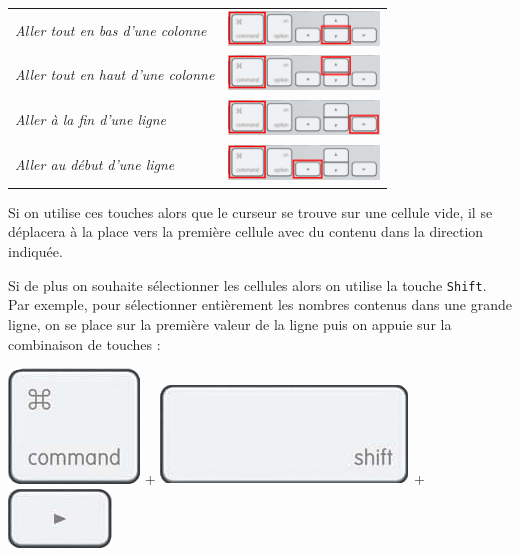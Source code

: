 \begin{center}
	\begin{tabular}{ll}
		\textsl{Aller tout en bas d'une colonne} & \includegraphics[width=4cm]{./images/tableur03/clavierCmDdown} \\     
		\textsl{Aller tout en haut d'une colonne} & \includegraphics[width=4cm]{./images/tableur03/clavierCmDup} \\  
		\textsl{Aller à la fin d'une ligne} & \includegraphics[width=4cm]{./images/tableur03/clavierCmDright} \\  
		\textsl{Aller au début d'une ligne} & \includegraphics[width=4cm]{./images/tableur03/clavierCmDleft} \\  
	\end{tabular}
\end{center}

Si on utilise ces touches alors que le curseur se trouve sur une cellule vide, il se déplacera à la place vers la première cellule avec du contenu dans la direction indiquée.

Si de plus on souhaite sélectionner les cellules alors on utilise la touche \texttt{Shift}. Par exemple, pour sélectionner entièrement les nombres contenus dans une grande ligne, on se place sur la première valeur de la ligne puis on appuie sur la combinaison de touches :

\begin{center}
	\includegraphics[scale=1.5]{./images/tableur03/clavierCmd}  + \includegraphics[scale=1.5]{./images/tableur03/clavierShift} + \includegraphics[scale=1.5]{./images/tableur03/clavierRight}
\end{center}